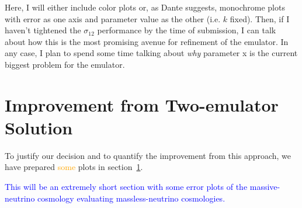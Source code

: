Here, I will either include color plots or, as Dante suggests, monochrome 
plots with error as one axis and parameter value as the other (i.e. $k$ 
fixed). Then, if I haven't tightened the $\sigma_{12}$ performance by the time 
of submission, I can talk about how this is the most promising avenue for 
refinement of the emulator. In any case, I plan to spend some time talking 
about \textit{why} parameter x is the current biggest problem for the 
emulator. 


\section{Improvement from Two-emulator Solution}
\label{sec: 2emu_improvement}

To justify our decision and to quantify the improvement from this approach, we
have prepared \textcolor{orange}{some} plots in
section~\ref{sec: 2emu_improvement}.

\textcolor{blue}{This will be an extremely short section with some error
plots of the massive-neutrino cosmology evaluating massless-neutrino
cosmologies.}